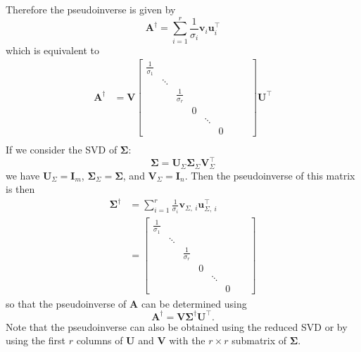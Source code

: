 \documentclass{article}
\begin{document}
Therefore the pseudoinverse is given by
\begin{equation*}
    \symbf{A}^\dagger = \sum_{i = 1}^r \frac{1}{\sigma_i} \symbf{v}_i \symbf{u}^\top_i
\end{equation*}
which is equivalent to
\begin{align*}
    \symbf{A}^\dagger & = \symbf{V}
    \begin{bmatrix}
        \frac{1}{\sigma_1} &        &                    &   &        &   &  &  & \\
                           & \ddots &                    &   &        &   &  &  & \\
                           &        & \frac{1}{\sigma_r} &   &        &   &  &  & \\
                           &        &                    & 0 &        &   &  &  & \\
                           &        &                    &   & \ddots &   &  &  & \\
                           &        &                    &   &        & 0 &  &  &
    \end{bmatrix}
    \symbf{U}^\top                  \\
\end{align*}
If we consider the SVD of \(\symbf{\Sigma}\):
\begin{equation*}
    \symbf{\Sigma} = \symbf{U}_\Sigma \symbf{\Sigma}_\Sigma \symbf{V}^\top_\Sigma
\end{equation*}
we have \(\symbf{U}_\Sigma = \symbf{I}_m\), \(\symbf{\Sigma}_\Sigma = \symbf{\Sigma}\), and \(\symbf{V}_\Sigma = \symbf{I}_n\).
Then the pseudoinverse of this matrix is then
\begin{align*}
    \symbf{\Sigma}^\dagger & = \sum_{i = 1}^r \frac{1}{\sigma_i} \symbf{v}_{\Sigma,\:i} \symbf{u}^\top_{\Sigma,\:i} \\
                           & =
    \begin{bmatrix}
        \frac{1}{\sigma_1} &        &                    &   &        &   &  & \\
                           & \ddots &                    &   &        &   &  & \\
                           &        & \frac{1}{\sigma_r} &   &        &   &  & \\
                           &        &                    & 0 &        &   &  & \\
                           &        &                    &   & \ddots &   &  & \\
                           &        &                    &   &        & 0 &  &
    \end{bmatrix}
\end{align*}
so that the pseudoinverse of \(\symbf{A}\) can be determined using
\begin{equation*}
    \symbf{A}^\dagger = \symbf{V} \symbf{\Sigma}^\dagger \symbf{U}^\top.
\end{equation*}
Note that the pseudoinverse can also be obtained using the reduced SVD or by using the first \(r\) columns of \(\symbf{U}\) and \(\symbf{V}\) with the \(r \times r\) submatrix of \(\symbf{\Sigma}\).
\end{document}
